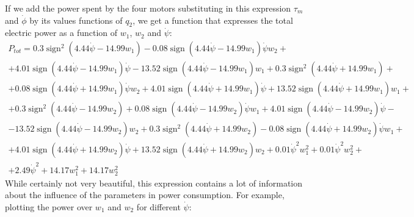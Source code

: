 \documentclass[12pt]{article}
\begin{document}
If we add the power spent by the four motors substituting in this expression $\tau_m$ and $\dot{\phi}$ by its values functions of $q_2$, we get a function that expresses the total electric power as a function of $w_1$, $w_2$ and $\dot{\psi}$:
\begin{multline}
P_{tot} = \displaystyle 0.3 \operatorname{sign}^{2}\left(4.44 \dot{\psi} - 14.99 w_1\right) - 0.08 \operatorname{sign}\left(4.44 \dot{\psi} - 14.99 w_1\right) \dot{\psi} w_2 + \\+4.01 \operatorname{sign}\left(4.44 \dot{\psi} - 14.99 w_1\right) \dot{\psi} - 13.52 \operatorname{sign}\left(4.44 \dot{\psi} - 14.99 w_1\right) w_1 + 0.3 \operatorname{sign}^{2}\left(4.44 \dot{\psi} + 14.99 w_1\right) +\\+ 0.08 \operatorname{sign}\left(4.44 \dot{\psi} + 14.99 w_1\right) \dot{\psi} w_2 + 4.01 \operatorname{sign}\left(4.44 \dot{\psi} + 14.99 w_1\right) \dot{\psi} + 13.52 \operatorname{sign}\left(4.44 \dot{\psi} + 14.99 w_1\right) w_1 +\\+ 0.3 \operatorname{sign}^{2}\left(4.44 \dot{\psi} - 14.99 w_2\right) + 0.08 \operatorname{sign}\left(4.44 \dot{\psi} - 14.99 w_2\right) \dot{\psi} w_1 + 4.01 \operatorname{sign}\left(4.44 \dot{\psi} - 14.99 w_2\right) \dot{\psi} -\\- 13.52 \operatorname{sign}\left(4.44 \dot{\psi} - 14.99 w_2\right) w_2 + 0.3 \operatorname{sign}^{2}\left(4.44 \dot{\psi} + 14.99 w_2\right) - 0.08 \operatorname{sign}\left(4.44 \dot{\psi} + 14.99 w_2\right) \dot{\psi} w_1 +\\+ 4.01 \operatorname{sign}\left(4.44 \dot{\psi} + 14.99 w_2\right) \dot{\psi} + 13.52 \operatorname{sign}\left(4.44 \dot{\psi} + 14.99 w_2\right) w_2 + 0.01 \dot{\psi}^{2} w_1^{2} + 0.01 \dot{\psi}^{2} w_2^{2} +\\+ 2.49 \dot{\psi}^{2} + 14.17 w_1^{2} + 14.17 w_2^{2}
\end{multline}
While certainly not very beautiful, this expression contains a lot of information about the influence of the parameters in power consumption. For example, plotting the power over $w_1$ and $w_2$ for different $\dot{\psi}$:
\end{document}
